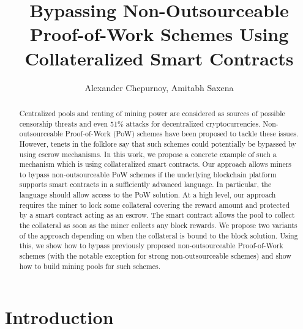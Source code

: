 \documentclass{llncs}
\begin{document}
\title{Bypassing Non-Outsourceable Proof-of-Work Schemes Using Collateralized Smart Contracts}

\author{Alexander Chepurnoy, Amitabh Saxena}


\maketitle

\begin{abstract}
    Centralized pools and renting of mining power are considered as sources of possible censorship threats and even 51\%
    attacks for decentralized cryptocurrencies. Non-outsourceable Proof-of-Work (PoW) schemes have been proposed to tackle these issues. However, tenets in the folklore say that such schemes could potentially be bypassed by using escrow mechanisms.
    In this work, we propose a concrete example of such a mechanism which is using collateralized smart contracts. Our approach allows miners to bypass non-outsourceable PoW schemes
    if the underlying blockchain platform supports smart contracts in a sufficiently advanced language. In particular, the language should allow access to the PoW solution.
    At a high level, our approach requires the miner to lock some collateral covering the reward amount and protected by a smart contract acting as an escrow. The smart contract allows the pool to collect the collateral as soon as the miner collects any block rewards. We propose two variants of the approach depending on when the collateral is bound to the block solution. Using this, we show how to bypass previously proposed non-outsourceable Proof-of-Work schemes (with the notable exception for strong non-outsourceable schemes) and show how to build mining pools for such schemes.
\end{abstract}

\section{Introduction}
\end{document}
